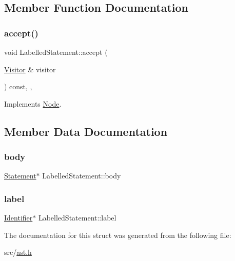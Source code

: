 \subsection{Member Function Documentation}
\mbox{\label{struct_labelled_statement_abc283c24da726909de0b3f96b18b7f86}} 
\subsubsection{\texorpdfstring{accept()}{accept()}}
{\footnotesize\ttfamily void Labelled\+Statement\+::accept (\begin{DoxyParamCaption}\item[{\hyperlink{struct_visitor}{Visitor} \&}]{visitor }\end{DoxyParamCaption}) const\hspace{0.3cm}{\ttfamily [inline]}, {\ttfamily [override]}, {\ttfamily [virtual]}}



Implements \hyperlink{struct_node_a10bd7af968140bbf5fa461298a969c71}{Node}.



\subsection{Member Data Documentation}
\mbox{\label{struct_labelled_statement_a5084b8d01545f2b3a37b036769c55e3a}} 
\subsubsection{\texorpdfstring{body}{body}}
{\footnotesize\ttfamily \hyperlink{struct_statement}{Statement}$\ast$ Labelled\+Statement\+::body}

\mbox{\label{struct_labelled_statement_aa3cb4a075ce2d599c8e1eca7700100b7}} 
\subsubsection{\texorpdfstring{label}{label}}
{\footnotesize\ttfamily \hyperlink{struct_identifier}{Identifier}$\ast$ Labelled\+Statement\+::label}



The documentation for this struct was generated from the following file\+:\begin{DoxyCompactItemize}
\item 
src/\hyperlink{ast_8h}{ast.\+h}\end{DoxyCompactItemize}
